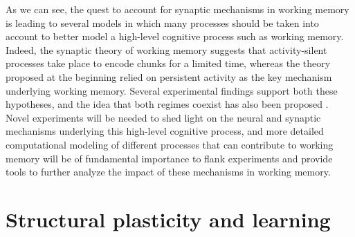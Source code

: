 \documentclass[a4paper, 12pt, twoside, openright]{book}
\begin{document}
As we can see, the quest to account for synaptic mechanisms in working memory is leading to several models in which many processes should be taken into account to better model a high-level cognitive process such as working memory. Indeed, the synaptic theory of working memory suggests that activity-silent processes take place to encode chunks for a limited time, whereas the theory proposed at the beginning relied on persistent activity as the key mechanism underlying working memory. Several experimental findings support both these hypotheses, and the idea that both regimes coexist has also been proposed \cite{Masse2019, Kamiski2019}. Novel experiments will be needed to shed light on the neural and synaptic mechanisms underlying this high-level cognitive process, and more detailed computational modeling of different processes that can contribute to working memory will be of fundamental importance to flank experiments and provide tools to further analyze the impact of these mechanisms in working memory.


\section*{Structural plasticity and learning}
\end{document}
